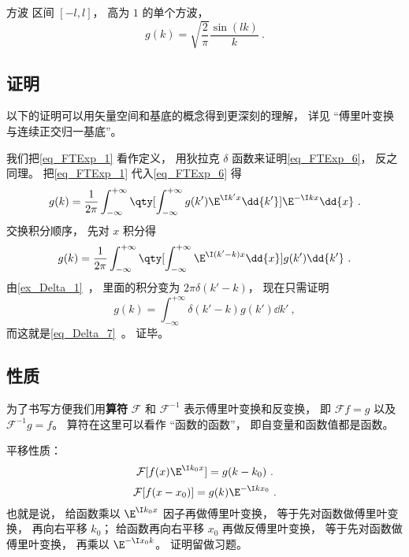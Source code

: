 \begin{example}{方波}
区间 $[-l,l]$， 高为 $1$ 的单个方波，
\begin{equation}
g(k) = \sqrt{\frac{2}{\pi}} \frac{\sin(lk)}{k}~.
\end{equation}
\end{example}

\subsection{证明}

以下的证明可以用矢量空间和基底的概念得到更深刻的理解， 详见 “傅里叶变换与连续正交归一基底”。

我们把\autoref{eq_FTExp_1} 看作定义， 用狄拉克 $\delta$ 函数来证明\autoref{eq_FTExp_6}， 反之同理。 把\autoref{eq_FTExp_1} 代入\autoref{eq_FTExp_6} 得
\begin{equation}
g(k) = \frac{1}{2\pi} \int_{-\infty}^{+\infty} \qty[ \int_{-\infty}^{+\infty} g(k') \E^{\I k' x} \dd{k'}] \E^{-\I k x} \dd{x}~.
\end{equation}
交换积分顺序， 先对 $x$ 积分得
\begin{equation}
g(k) = \frac{1}{2\pi} \int_{-\infty}^{+\infty} \qty[ \int_{-\infty}^{+\infty}  \E^{\I (k'-k) x} \dd{x}]  g(k')\dd{k'}~.
\end{equation}
由\autoref{ex_Delta_1}~， 里面的积分变为 $2\pi\delta(k'-k)$， 现在只需证明
\begin{equation}
g(k) = \int_{-\infty}^{+\infty} \delta(k'-k)  g(k')\dd{k'}~,
\end{equation}
而这就是\autoref{eq_Delta_7}~。 证毕。

\subsection{性质}
为了书写方便我们用\textbf{算符} $\mathcal F$ 和 $\mathcal F^{-1}$ 表示傅里叶变换和反变换， 即 $\mathcal F f = g$ 以及 $\mathcal F^{-1} g = f$。 算符在这里可以看作 “函数的函数”， 即自变量和函数值都是函数。

平移性质：
\begin{equation}\label{eq_FTExp_4}
\mathcal F [f(x) \E^{\I k_0 x}] = g(k - k_0)~.
\end{equation}
\begin{equation}\label{eq_FTExp_7}
\mathcal F[f(x - x_0)] = g(k) \E^{-\I k x_0}~.
\end{equation}
也就是说， 给函数乘以 $\E^{\I k_0 x}$ 因子再做傅里叶变换， 等于先对函数做傅里叶变换， 再向右平移 $k_0$； 给函数再向右平移 $x_0$ 再做反傅里叶变换， 等于先对函数做傅里叶变换， 再乘以 $\E^{-\I x_0 k}$。 证明留做习题。

